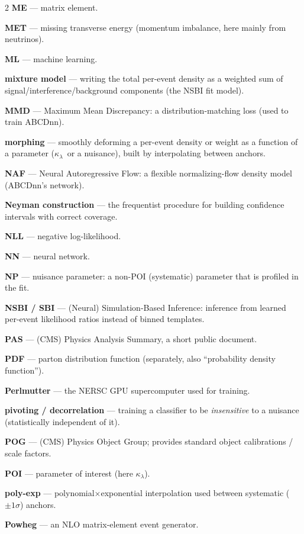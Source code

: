 \documentclass[11pt]{article}
\newcommand{\kl}{\ensuremath{\kappa_\lambda}}
\begin{document}
{\begin{multicols}{2}
\textbf{ME} --- matrix element.

\textbf{MET} --- missing transverse energy (momentum imbalance, here mainly from neutrinos).

\textbf{ML} --- machine learning.

\textbf{mixture model} --- writing the total per-event density as a weighted sum of signal/interference/background components (the NSBI fit model).

\textbf{MMD} --- Maximum Mean Discrepancy: a distribution-matching loss (used to train ABCDnn).

\textbf{morphing} --- smoothly deforming a per-event density or weight as a function of a parameter (\kl\ or a nuisance), built by interpolating between anchors.

\textbf{NAF} --- Neural Autoregressive Flow: a flexible normalizing-flow density model (ABCDnn's network).

\textbf{Neyman construction} --- the frequentist procedure for building confidence intervals with correct coverage.

\textbf{NLL} --- negative log-likelihood.

\textbf{NN} --- neural network.

\textbf{NP} --- nuisance parameter: a non-POI (systematic) parameter that is profiled in the fit.

\textbf{NSBI / SBI} --- (Neural) Simulation-Based Inference: inference from learned per-event likelihood ratios instead of binned templates.

\textbf{PAS} --- (CMS) Physics Analysis Summary, a short public document.

\textbf{PDF} --- parton distribution function (separately, also ``probability density function'').

\textbf{Perlmutter} --- the NERSC GPU supercomputer used for training.

\textbf{pivoting / decorrelation} --- training a classifier to be \emph{insensitive} to a nuisance (statistically independent of it).

\textbf{POG} --- (CMS) Physics Object Group; provides standard object calibrations / scale factors.

\textbf{POI} --- parameter of interest (here \kl).

\textbf{poly-exp} --- polynomial$\times$exponential interpolation used between systematic ($\pm1\sigma$) anchors.

\textbf{Powheg} --- an NLO matrix-element event generator.


\end{multicols}}
\end{document}
